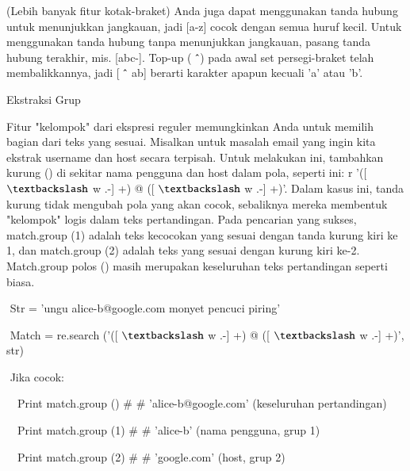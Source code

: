 \documentclass[a4paper,12pt]{report}
\begin{document}
(Lebih banyak fitur kotak-braket) Anda juga dapat menggunakan tanda hubung untuk menunjukkan jangkauan, jadi [a-z] cocok dengan semua huruf kecil. Untuk menggunakan tanda hubung tanpa menunjukkan jangkauan, pasang tanda hubung terakhir, mis. [abc-]. Top-up ( $  \string^  $) pada awal set persegi-braket telah membalikkannya, jadi [ $  \string^  $ ab] berarti karakter apapun kecuali 'a' atau 'b'. \par
\noindent 
\vspace{16pt}
\noindent 
Ekstraksi Grup \par
\noindent 
\vspace{12pt}
\noindent 
Fitur "kelompok" dari ekspresi reguler memungkinkan Anda untuk memilih bagian dari teks yang sesuai. Misalkan untuk masalah email yang ingin kita ekstrak username dan host secara terpisah. Untuk melakukan ini, tambahkan kurung () di sekitar nama pengguna dan host dalam pola, seperti ini: r '([ $  \textbackslash  $ w .-] +) @ ([ $  \textbackslash  $ w .-] +)'. Dalam kasus ini, tanda kurung tidak mengubah pola yang akan cocok, sebaliknya mereka membentuk "kelompok" logis dalam teks pertandingan. Pada pencarian yang sukses, match.group (1) adalah teks kecocokan yang sesuai dengan tanda kurung kiri ke 1, dan match.group (2) adalah teks yang sesuai dengan kurung kiri ke-2. Match.group polos () masih merupakan keseluruhan teks pertandingan seperti biasa. \par
\noindent 
\vspace{10pt}
\noindent 
{\fontsize{10pt}{10pt}\selectfont  $  $ $  $Str = 'ungu alice-b@google.com monyet pencuci piring'} \par
\noindent 
{\fontsize{10pt}{10pt}\selectfont  $  $ $  $Match = re.search ('([ $  \textbackslash  $ w .-] +) @ ([ $  \textbackslash  $ w .-] +)', str)} \par
\noindent 
{\fontsize{10pt}{10pt}\selectfont  $  $ $  $Jika cocok:} \par
\noindent 
{\fontsize{10pt}{10pt}\selectfont  $  $ $  $ $  $ $  $Print match.group ()  $  \#  $ $  \#  $ 'alice-b@google.com' (keseluruhan pertandingan)} \par
\noindent 
{\fontsize{10pt}{10pt}\selectfont  $  $ $  $ $  $ $  $Print match.group (1)  $  \#  $ $  \#  $ 'alice-b' (nama pengguna, grup 1)} \par
\noindent 
{\fontsize{10pt}{10pt}\selectfont  $  $ $  $ $  $ $  $Print match.group (2)  $  \#  $ $  \#  $ 'google.com' (host, grup 2)} \par
\noindent 
\vspace{10pt}
\end{document}
